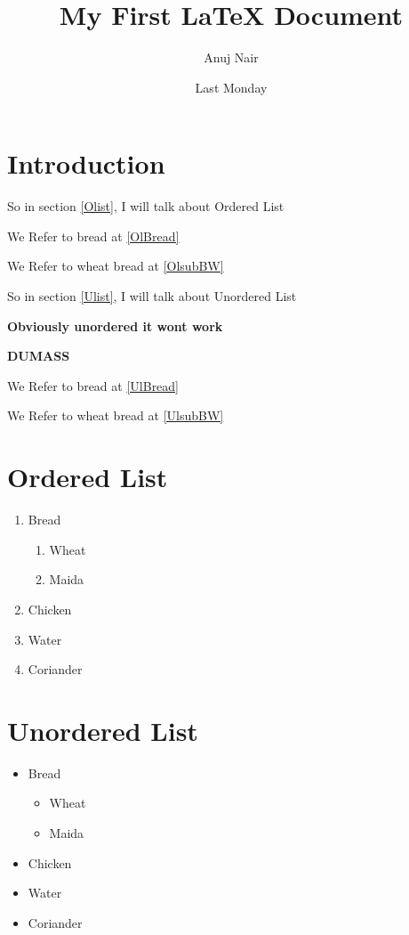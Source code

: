 \documentclass{article}
\author{Anuj Nair}
\title{My First {\LaTeX} Document}
\date{Last Monday}
\begin{document}
\maketitle


\section{Introduction}

 So in section \ref{Olist}, I will talk about Ordered List

We Refer to bread at \ref{OlBread}

We Refer to wheat bread at \ref{OlsubBW} 

So in section \ref{Ulist}, I will talk about Unordered List

\textbf{Obviously unordered it wont work}


\textbf{DUMASS}

We Refer to bread at \ref{UlBread}

We Refer to wheat bread at \ref{UlsubBW} 

\section{Ordered List\label{Olist}}
\begin{enumerate}
  \item Bread\label{OlBread}
    \begin{enumerate}
      \item Wheat\label{OlsubBW}
      \item Maida
    \end{enumerate}
  \item Chicken
  \item Water
  \item Coriander 
\end{enumerate}

\section{Unordered List\label{Ulist}}
\begin{itemize} 
  \item Bread\label{UlBread}
    \begin{itemize}
      \item Wheat\label{UlsubBW}
      \item Maida
    \end{itemize}
  \item Chicken
  \item Water
  \item Coriander 
\end{itemize}
\end{document}

